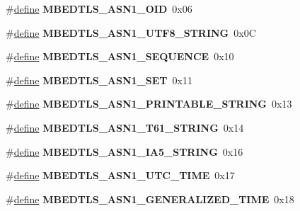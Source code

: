 \begin{DoxyCompactItemize}
\#\hyperlink{structdefine}{define} {\bfseries M\+B\+E\+D\+T\+L\+S\+\_\+\+A\+S\+N1\+\_\+\+O\+ID}~0x06
\item 
\mbox{\label{group__asn1__module_gafc28060cb0e9b2be4f0960ad345a2e42}} 
\#\hyperlink{structdefine}{define} {\bfseries M\+B\+E\+D\+T\+L\+S\+\_\+\+A\+S\+N1\+\_\+\+U\+T\+F8\+\_\+\+S\+T\+R\+I\+NG}~0x0C
\item 
\mbox{\label{group__asn1__module_ga64ce838eb4418e69fe9aa251436203b3}} 
\#\hyperlink{structdefine}{define} {\bfseries M\+B\+E\+D\+T\+L\+S\+\_\+\+A\+S\+N1\+\_\+\+S\+E\+Q\+U\+E\+N\+CE}~0x10
\item 
\mbox{\label{group__asn1__module_ga67afaa83253889dacb9fcb47062162c5}} 
\#\hyperlink{structdefine}{define} {\bfseries M\+B\+E\+D\+T\+L\+S\+\_\+\+A\+S\+N1\+\_\+\+S\+ET}~0x11
\item 
\mbox{\label{group__asn1__module_ga57f497984e573597e1ed100afcc3f965}} 
\#\hyperlink{structdefine}{define} {\bfseries M\+B\+E\+D\+T\+L\+S\+\_\+\+A\+S\+N1\+\_\+\+P\+R\+I\+N\+T\+A\+B\+L\+E\+\_\+\+S\+T\+R\+I\+NG}~0x13
\item 
\mbox{\label{group__asn1__module_gabe4ca1599521c0a3b4c54391906c2083}} 
\#\hyperlink{structdefine}{define} {\bfseries M\+B\+E\+D\+T\+L\+S\+\_\+\+A\+S\+N1\+\_\+\+T61\+\_\+\+S\+T\+R\+I\+NG}~0x14
\item 
\mbox{\label{group__asn1__module_ga30d5d0f805af50deb5820e741a53e481}} 
\#\hyperlink{structdefine}{define} {\bfseries M\+B\+E\+D\+T\+L\+S\+\_\+\+A\+S\+N1\+\_\+\+I\+A5\+\_\+\+S\+T\+R\+I\+NG}~0x16
\item 
\mbox{\label{group__asn1__module_gac4e932ef9cdf9fa9b8fb152357c6ec64}} 
\#\hyperlink{structdefine}{define} {\bfseries M\+B\+E\+D\+T\+L\+S\+\_\+\+A\+S\+N1\+\_\+\+U\+T\+C\+\_\+\+T\+I\+ME}~0x17
\item 
\mbox{\label{group__asn1__module_ga29f746333b11a4d9e0b7624dcd982fdb}} 
\#\hyperlink{structdefine}{define} {\bfseries M\+B\+E\+D\+T\+L\+S\+\_\+\+A\+S\+N1\+\_\+\+G\+E\+N\+E\+R\+A\+L\+I\+Z\+E\+D\+\_\+\+T\+I\+ME}~0x18
\item 

\end{DoxyCompactItemize}
